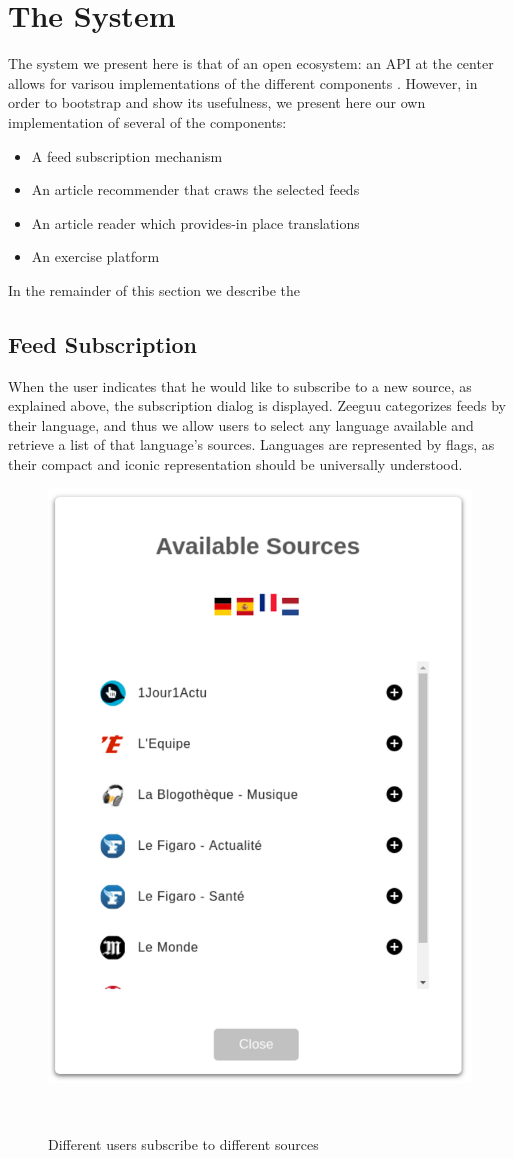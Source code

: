 
\newpage
\section{The System}

The system we present here is that of an open ecosystem: an API at the center allows for varisou implementations of the different components \cite{Lungu16}. However, in order to bootstrap and show its usefulness, we present here our own implementation of several of the components: 

\begin{itemize}
  \item A feed subscription mechanism
  \item An article recommender that craws the selected feeds
  \item An article reader which provides-in place translations
  \item An exercise platform 
\end{itemize}

In the remainder of this section we describe the 


\subsection {Feed Subscription}

When the user indicates that he would like to subscribe to a new source, as explained above, the subscription dialog is displayed. Zeeguu categorizes feeds by their language, and thus we allow users to select any language available and retrieve a list of that language’s sources. Languages are represented by flags, as their compact and iconic representation should be universally understood.

\begin{figure}[h!]
\centering
  \includegraphics[width=0.5\columnwidth]{figures/available_sources}
  \caption{Different users subscribe to different sources}~\label{fig:registrations}
\end{figure}


